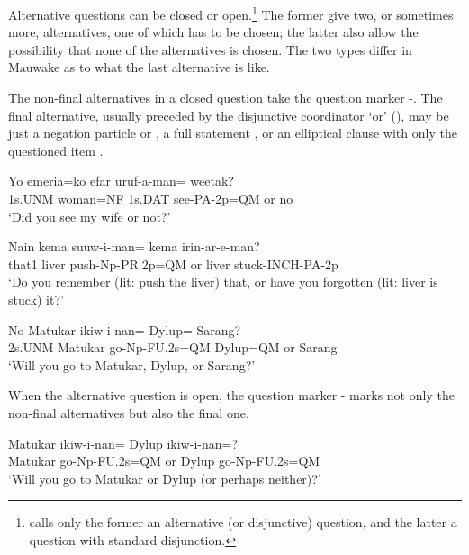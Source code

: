 Alternative questions can be closed or open.\footnote{\citet{Haspelmath2007} calls only the former an alternative (or disjunctive) question, and the latter a question with standard disjunction.} The former give two, or sometimes more, alternatives, one of which has to be chosen; the latter also allow the possibility that none of the alternatives is chosen. The two types differ in Mauwake as to what the last alternative is like.

The non-final alternatives in a closed question take the question marker -. The final alternative, usually preceded by the disjunctive coordinator  `or' (), may be just a negation particle  or  , a full statement , or an elliptical clause with only the questioned item .

\ea%
\label{ex:x1182}
\gll Yo  emeria=ko  efar  uruf-a-man=    weetak? \\
1s.UNM  woman=NF  1s.DAT  see-PA-2p=QM  or  no      \\
\glt `Did you see my wife or not?'
\z





\ea%
\label{ex:x1183}
\gll Nain  kema  suuw-i-man=    kema  irin-ar-e-man? \\
that1  liver  push-Np-PR.2p=QM  or  liver  stuck-INCH-PA-2p      \\
\glt `Do you remember (lit: push the liver) that, or have you forgotten (lit: liver is stuck) it?'
\z




\ea%
\label{ex:x1184}
\gll No  Matukar  ikiw-i-nan=  Dylup=    Sarang? \\
2s.UNM  Matukar  go-Np-FU.2s=QM  Dylup=QM  or  Sarang      \\
\glt `Will you go to Matukar, Dylup, or Sarang?'
\z


When the alternative question is open, the question marker -  marks not only the non-final alternatives but also the final one. 

\ea%
\label{ex:x1185}
\gll Matukar  ikiw-i-nan=    Dylup  ikiw-i-nan=? \\
Matukar  go-Np-FU.2s=QM  or  Dylup  go-Np-FU.2s=QM      \\
\glt `Will you go to Matukar or Dylup (or perhaps neither)?'
\z





